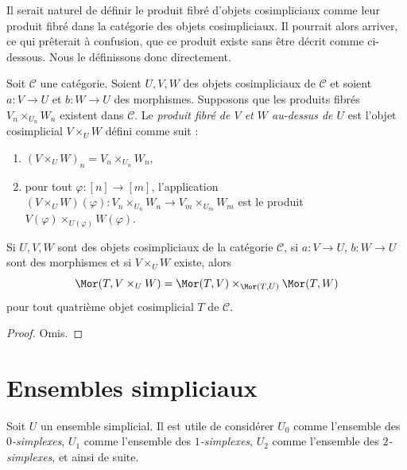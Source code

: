 \noindent
Il serait naturel de définir le produit fibré d'objets cosimpliciaux comme
leur produit fibré dans la catégorie des objets cosimpliciaux. Il pourrait
alors arriver, ce qui prêterait à confusion, que ce produit existe sans être
décrit comme ci-dessous. Nous le définissons donc directement.

\begin{definition}
\label{definition-fibre-product-cosimplicial-objects}
Soit $\mathcal{C}$ une catégorie. Soient $U, V, W$ des objets
cosimpliciaux de $\mathcal{C}$ et soient $a : V \to U$ et $b : W \to U$
des morphismes. Supposons que les produits fibrés
$V_n \times_{U_n} W_n$ existent dans $\mathcal{C}$. Le {\it produit
fibré de $V$ et $W$ au-dessus de $U$} est l'objet cosimplicial
$V \times_U W$ défini comme suit :
\begin{enumerate}
\item $(V \times_U W)_n = V_n \times_{U_n} W_n$,
\item pour tout $\varphi : [n] \to [m]$, l'application
$(V \times_U W)(\varphi) : V_n \times_{U_n} W_n \to V_m \times_{U_m} W_m$
est le produit $V(\varphi) \times_{U(\varphi)} W(\varphi)$.
\end{enumerate}
\end{definition}

\begin{lemma}
\label{lemma-fibre-product-cosimplicial-objects}
Si $U, V, W$ sont des objets cosimpliciaux de la catégorie $\mathcal{C}$,
si $a : V \to U$, $b : W \to U$ sont des morphismes et si
$V \times_U W$ existe, alors
$$
\Mor(T, V \times_U W) =
\Mor(T, V) \times_{\Mor(T, U)}
\Mor(T, W)
$$
pour tout quatrième objet cosimplicial $T$ de $\mathcal{C}$.
\end{lemma}

\begin{proof}
Omis.
\end{proof}














\section{Ensembles simpliciaux}
\label{section-simplicial-set}

\noindent
Soit $U$ un ensemble simplicial. Il est utile de considérer $U_0$ comme
l'ensemble des {\it $0$-simplexes}, $U_1$ comme l'ensemble des
{\it $1$-simplexes}, $U_2$ comme l'ensemble des {\it $2$-simplexes},
et ainsi de suite.

